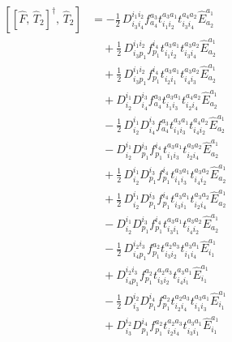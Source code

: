 \documentclass[11pt]{article}
\begin{document}
\begin{align}
\left[\left[\hat{F},\, \hat{T}_{2}\right]^{\dagger},\, \hat{T}_{2}\right] &= - \tfrac{1}{2}\, D^{i_{1}i_{2}}_{i_{3}i_{4}} f^{a_{3}}_{a_{4}} t^{a_{3}a_{1}}_{i_{1}i_{2}} t^{a_{4}a_{2}}_{i_{3}i_{4}} \hat{E}^{a_{1}}_{a_{2}} \\
&\quad + \tfrac{1}{2}\, D^{i_{1}i_{2}}_{i_{3}p_{1}} f^{i_{4}}_{p_{1}} t^{a_{3}a_{1}}_{i_{1}i_{2}} t^{a_{3}a_{2}}_{i_{3}i_{4}} \hat{E}^{a_{1}}_{a_{2}} \\
&\quad + \tfrac{1}{2}\, D^{i_{1}i_{2}}_{i_{3}p_{1}} f^{i_{4}}_{p_{1}} t^{a_{3}a_{1}}_{i_{2}i_{1}} t^{a_{3}a_{2}}_{i_{4}i_{3}} \hat{E}^{a_{1}}_{a_{2}} \\
&\quad + D^{i_{1}}_{i_{2}} D^{i_{3}}_{i_{4}} f^{a_{3}}_{a_{4}} t^{a_{3}a_{1}}_{i_{1}i_{3}} t^{a_{4}a_{2}}_{i_{2}i_{4}} \hat{E}^{a_{1}}_{a_{2}} \\
&\quad - \tfrac{1}{2}\, D^{i_{1}}_{i_{2}} D^{i_{3}}_{i_{4}} f^{a_{3}}_{a_{4}} t^{a_{3}a_{1}}_{i_{1}i_{3}} t^{a_{4}a_{2}}_{i_{4}i_{2}} \hat{E}^{a_{1}}_{a_{2}} \\
&\quad - D^{i_{1}}_{i_{2}} D^{i_{3}}_{p_{1}} f^{i_{4}}_{p_{1}} t^{a_{3}a_{1}}_{i_{1}i_{3}} t^{a_{3}a_{2}}_{i_{2}i_{4}} \hat{E}^{a_{1}}_{a_{2}} \\
&\quad + \tfrac{1}{2}\, D^{i_{1}}_{i_{2}} D^{i_{3}}_{p_{1}} f^{i_{4}}_{p_{1}} t^{a_{3}a_{1}}_{i_{1}i_{3}} t^{a_{3}a_{2}}_{i_{4}i_{2}} \hat{E}^{a_{1}}_{a_{2}} \\
&\quad + \tfrac{1}{2}\, D^{i_{1}}_{i_{2}} D^{i_{3}}_{p_{1}} f^{i_{4}}_{p_{1}} t^{a_{3}a_{1}}_{i_{3}i_{1}} t^{a_{3}a_{2}}_{i_{2}i_{4}} \hat{E}^{a_{1}}_{a_{2}} \\
&\quad - D^{i_{1}}_{i_{2}} D^{i_{3}}_{p_{1}} f^{i_{4}}_{p_{1}} t^{a_{3}a_{1}}_{i_{3}i_{1}} t^{a_{3}a_{2}}_{i_{4}i_{2}} \hat{E}^{a_{1}}_{a_{2}} \\
&\quad - \tfrac{1}{2}\, D^{i_{2}i_{3}}_{i_{4}p_{1}} f^{a_{2}}_{p_{1}} t^{a_{2}a_{3}}_{i_{3}i_{2}} t^{a_{3}a_{1}}_{i_{1}i_{4}} \hat{E}^{a_{1}}_{i_{1}} \\
&\quad + D^{i_{2}i_{3}}_{i_{4}p_{1}} f^{a_{2}}_{p_{1}} t^{a_{2}a_{3}}_{i_{3}i_{2}} t^{a_{3}a_{1}}_{i_{4}i_{1}} \hat{E}^{a_{1}}_{i_{1}} \\
&\quad - \tfrac{1}{2}\, D^{i_{2}}_{i_{3}} D^{i_{4}}_{p_{1}} f^{a_{2}}_{p_{1}} t^{a_{2}a_{3}}_{i_{2}i_{4}} t^{a_{3}a_{1}}_{i_{1}i_{3}} \hat{E}^{a_{1}}_{i_{1}} \\
&\quad + D^{i_{2}}_{i_{3}} D^{i_{4}}_{p_{1}} f^{a_{2}}_{p_{1}} t^{a_{2}a_{3}}_{i_{2}i_{4}} t^{a_{3}a_{1}}_{i_{3}i_{1}} \hat{E}^{a_{1}}_{i_{1}} \\

\end{align}
\end{document}

